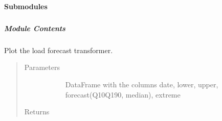 \documentclass[letterpaper,10pt,english]{sphinxmanual}
\begin{document}
\subsubsection{}
\label{\detokenize{autoapi/src/plot/index:module-src.plot}}\label{\detokenize{autoapi/src/plot/index:src-plot}}\label{\detokenize{autoapi/src/plot/index::doc}}

\paragraph{Submodules}
\label{\detokenize{autoapi/src/plot/index:submodules}}

\subparagraph{}
\label{\detokenize{autoapi/src/plot/altair/index:module-src.plot.altair}}\label{\detokenize{autoapi/src/plot/altair/index:src-plot-altair}}\label{\detokenize{autoapi/src/plot/altair/index::doc}}

\subparagraph{Module Contents}
\label{\detokenize{autoapi/src/plot/altair/index:module-contents}}

\begin{fulllineitems}
\label{\detokenize{autoapi/src/plot/altair/index:src.plot.altair.plot_estimate}}
Plot the load forecast transformer.
\begin{quote}\begin{description}
\item[{Parameters}] \leavevmode\begin{description}
\item[{}] \leavevmode{[}\sphinxcode{\sphinxupquote{pd.DataFrame}}{]}
DataFrame with the columns date, lower, upper, forecast(Q10\sphinxhyphen{}Q190, median), extreme

\end{description}

\item[{Returns}] \leavevmode\begin{description}
\item[{ }] \leavevmode
\end{description}

\end{description}\end{quote}

\end{fulllineitems}
\end{document}
